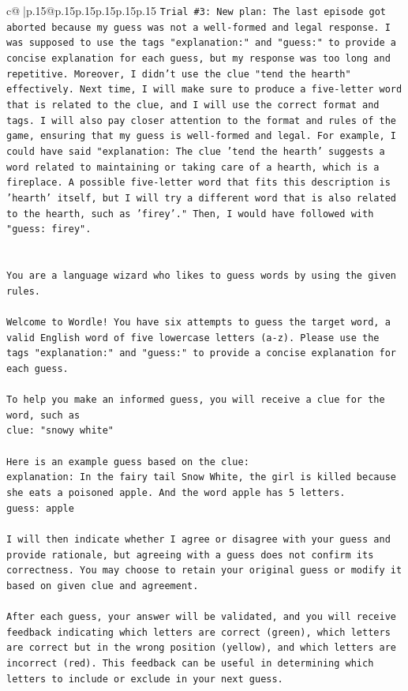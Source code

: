 \documentclass{article}
\begin{document}
{\begin{supertabular}{c@{$\;$}|p{.15\linewidth}@{}p{.15\linewidth}p{.15\linewidth}p{.15\linewidth}p{.15\linewidth}p{.15\linewidth}}
{{{\texttt{Trial \#3: New plan: The last episode got aborted because my guess was not a well{-}formed and legal response. I was supposed to use the tags "explanation:" and "guess:" to provide a concise explanation for each guess, but my response was too long and repetitive. Moreover, I didn't use the clue "tend the hearth" effectively. Next time, I will make sure to produce a five{-}letter word that is related to the clue, and I will use the correct format and tags. I will also pay closer attention to the format and rules of the game, ensuring that my guess is well{-}formed and legal. For example, I could have said "explanation: The clue 'tend the hearth' suggests a word related to maintaining or taking care of a hearth, which is a fireplace. A possible five{-}letter word that fits this description is 'hearth' itself, but I will try a different word that is also related to the hearth, such as 'firey'." Then, I would have followed with "guess: firey".} \\
\\ 
\\ 
\texttt{You are a language wizard who likes to guess words by using the given rules.} \\
\\ 
\texttt{Welcome to Wordle! You have six attempts to guess the target word, a valid English word of five lowercase letters (a{-}z). Please use the tags "explanation:" and "guess:" to provide a concise explanation for each guess.} \\
\\ 
\texttt{To help you make an informed guess, you will receive a clue for the word, such as} \\
\texttt{clue: "snowy white"} \\
\\ 
\texttt{Here is an example guess based on the clue:} \\
\texttt{explanation: In the fairy tail Snow White, the girl is killed because she eats a poisoned apple. And the word apple has 5 letters.} \\
\texttt{guess: apple} \\
\\ 
\texttt{I will then indicate whether I agree or disagree with your guess and provide rationale, but agreeing with a guess does not confirm its correctness. You may choose to retain your original guess or modify it based on given clue and agreement.} \\
\\ 
\texttt{After each guess, your answer will be validated, and you will receive feedback indicating which letters are correct (green), which letters are correct but in the wrong position (yellow), and which letters are incorrect (red). This feedback can be useful in determining which letters to include or exclude in your next guess.} \\
}}}
\end{supertabular}}
\end{document}
